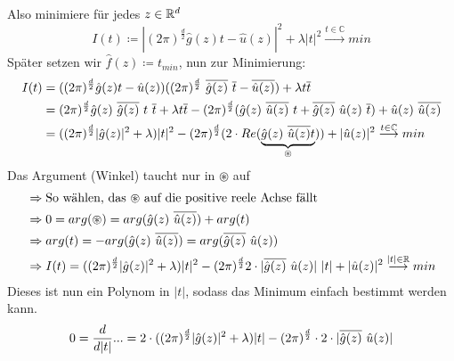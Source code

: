 \begin{enumerate}[label = \arabic*. Ansatz:]
                    Also minimiere für jedes $z \in \mathbb R^d$
                    \[I(t) \coloneqq |(2 \pi)^\frac{d}{2} \hat g(z)t - \hat u(z)|^2 + \lambda |t|^2 \overset{t \in \mathbb C}{\longrightarrow}min\]
                    Später setzen wir $\hat f(z) \coloneqq t_{min}$, nun zur Minimierung:
                    \begin{align*}
                        I(t)&=((2 \pi)^\frac{d}{2} \hat g(z) t - \hat u(z))((2 \pi)^\frac{d}{2} \ \overline{\hat g(z)} \ \overline t -\overline{\hat u (z)}) + \lambda t \overline t\\
                        &=(2 \pi)^\frac{d}{2} \hat g(z) \ \overline{\hat g(z)} \ t \ \overline t + \lambda t \overline t - (2 \pi)^\frac{d}{2} (\hat g(z) \ \overline{\hat u(z)} \ t + \overline{\hat g(z)} \ \hat u(z) \ \overline{t}) + \hat u(z) \ \overline{\hat u(z)}\\
                        &=((2 \pi)^\frac{d}{2} |\hat g(z)|^2 + \lambda)|t|^2 - (2 \pi)^\frac{d}{2} (2 \C Re(\underbrace{\hat g(z) \ \overline{\hat u(z)}t}_{\circledast})) + |\hat u(z)|^2 \overset{t \in \mathbb C}{\longrightarrow} min\\
                    \end{align*}
                    Das Argument (Winkel) taucht nur in $\circledast$ auf\\
                    \begin{align*}
                        &\Rightarrow \text{So wählen, das $\circledast$ auf die positive reele Achse fällt}\\
                        &\Rightarrow 0=arg(\circledast)= arg(\hat g(z) \ \overline{\hat u(z)}) + arg(t)\\
                        &\Rightarrow arg(t)=-arg(\hat g(z) \ \overline{\hat u(z)})=arg(\overline{\hat g(z)} \ \hat u(z))\\
                        &\Rightarrow I(t) = ((2\pi)^\frac{d}{2} |\hat g(z)|^2 + \lambda)|t|^2 - (2\pi)^\frac{d}{2} 2 \C |\overline{\hat g(z)} \ \hat u(z)| \ |t| + |\hat u (z)|^2 \overset{|t| \in \R}{\longrightarrow}min
                    \end{align*}
                    Dieses ist nun ein Polynom in $|t|$, sodass das Minimum einfach bestimmt werden kann.\\
                    \begin{align*}
                        &0=\frac{d}{d|t|}...=2\C((2\pi)^\frac{d}{2}|\hat g(z)|^2 + \lambda)|t| - (2\pi)^\frac{d}{2} \C 2 \C |\overline{\hat g(z)} \ \hat u(z)|\\

\end{align*}
\end{enumerate}
